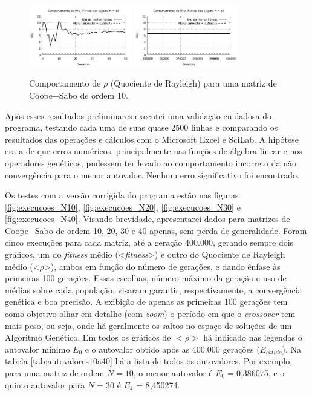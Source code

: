 	\begin{figure}[htbp]
		\centering
			\includegraphics[width=0.40\textwidth]{figs/resultados/rho_N10_g50.pdf}
			\includegraphics[width=0.40\textwidth]{figs/resultados/rho_N10_g400000.pdf}
		\caption{Comportamento de $\rho$ (Quociente de Rayleigh) para uma matriz de Coope$-$Sabo de ordem 10.}
		\label{fig:rho_N10}
	\end{figure}
	
	\newpage
	
	Após esses resultados preliminares executei uma validação cuidadosa do programa, testando cada uma de suas quase 2500 linhas e comparando os resultados das operações e cálculos com o Microsoft Excel e SciLab. A hipótese era a de que erros numéricos, principalmente nas funções de álgebra linear e nos operadores genéticos, pudessem ter levado ao comportamento incorreto da não convergência para o menor autovalor. Nenhum erro significativo foi encontrado.
	
	Os testes com a versão corrigida do programa estão nas figuras \ref{fig:execucoes_N10}, \ref{fig:execucoes_N20}, \ref{fig:execucoes_N30} e \ref{fig:execucoes_N40}. Visando brevidade, apresentarei dados para matrizes de Coope$-$Sabo de ordem 10, 20, 30 e 40 apenas, sem perda de generalidade. Foram cinco execuções para cada matriz, até a geração 400.000, gerando sempre dois gráficos, um do \textit{fitness} médio (<\textit{fitness}>) e outro do Quociente de Rayleigh médio (<$\rho$>), ambos em função do número de gerações, e dando ênfase às primeiras 100 gerações. Essas escolhas, número máximo da geração e uso de médias sobre cada população, visaram garantir, respectivamente, a convergência genética e boa precisão. A exibição de apenas as primeiras 100 gerações tem como objetivo olhar em detalhe (com \textit{zoom}) o período em que o \textit{crossover} tem mais peso, ou seja, onde há geralmente os saltos no espaço de soluções de um Algoritmo Genético. Em todos os gráficos de $<\rho>$ há indicado nas legendas o autovalor mínimo $E_0$ e o autovalor obtido após as 400.000 gerações ($E_{obtido}$). Na tabela \ref{tab:autovalores10a40} há a lista de todos os autovalores. Por exemplo, para uma matriz de ordem $N = 10$, o menor autovalor é $E_0 = $0,386075, e o quinto autovalor para $N = 30$ é $E_4$ = 8,450274.

